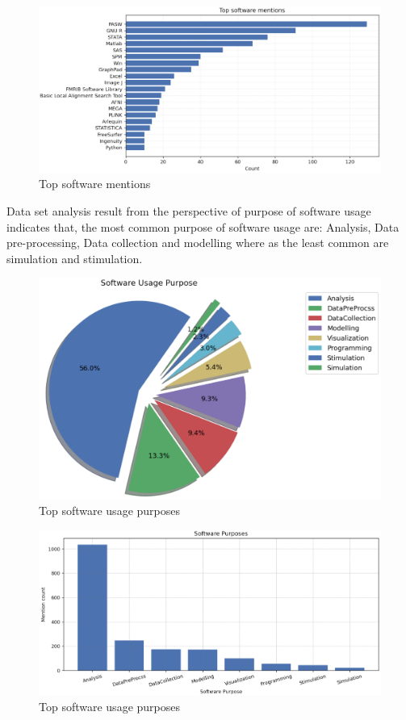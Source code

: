 \begin{figure}[htbp]
	\centering
	\includegraphics[width=1\textwidth]{4.graphics/figures/analysisresults/1.Top software mentions}
	\caption{Top software mentions}
	\label{fig:chapter03:setup}
\end{figure}

Data set analysis result from the perspective of purpose of software usage indicates that, the most common purpose of software usage are: Analysis, Data pre-processing, Data collection and modelling where as the least common are simulation and stimulation. 

\begin{figure}[htbp]
	\centering
	\includegraphics[width=.65\textwidth]{4.graphics/figures/analysisresults/2.Software Usage Purpose pie}
	\caption{Top software usage purposes}
	\label{fig:chapter03:setup}
\end{figure}

\begin{figure}[htbp]
	\centering
	\includegraphics[width=1\textwidth]{4.graphics/figures/analysisresults/3.Software Purposes}
	\caption{Top software usage purposes}
	\label{fig:chapter03:setup}
\end{figure}

